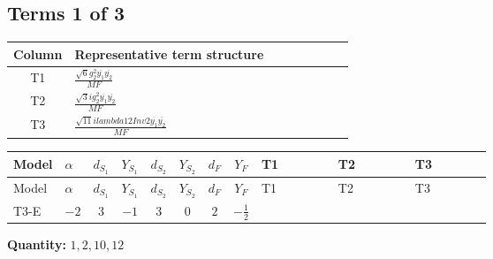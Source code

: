 \documentclass[8pt]{article}
\begin{document}
\begin{landscape}
\subsection*{Terms 1 of 3}
\begin{center}
\begin{tabular}{@{}c >{\raggedright\arraybackslash}p{0.82\linewidth}@{}}
\toprule
Column & Representative term structure \\
\midrule
T1 & \(\displaystyle \frac{\sqrt{6} g_{2}^{2} \overline{y_{1}} \overline{y_{2}}}{MF}\) \\
\midrule
T2 & \(\displaystyle \frac{\sqrt{3} i g_{2}^{2} \overline{y_{1}} \overline{y_{2}}}{MF}\) \\
\midrule
T3 & \(\displaystyle \frac{\sqrt{11} i lambda12Inv2 \overline{y_{1}} \overline{y_{2}}}{MF}\) \\
\midrule
\bottomrule
\end{tabular}
\end{center}
\smallskip
\tiny
\begin{longtable}{@{}llcccccc >{\raggedright\arraybackslash}p{0.21\linewidth} >{\raggedright\arraybackslash}p{0.21\linewidth} >{\raggedright\arraybackslash}p{0.21\linewidth}@{}}
\toprule
Model & $\alpha$ & $d_{S_1}$ & $Y_{S_1}$ & $d_{S_2}$ & $Y_{S_2}$ & $d_F$ & $Y_F$ & T1 & T2 & T3 \\
\midrule
\endfirsthead
\toprule
Model & $\alpha$ & $d_{S_1}$ & $Y_{S_1}$ & $d_{S_2}$ & $Y_{S_2}$ & $d_F$ & $Y_F$ & T1 & T2 & T3 \\
\midrule
\endhead
T3-E & $-2$ & $3$ & $-1$ & $3$ & $0$ & $2$ & $-\frac{1}{2}$ & \scriptsize\adjustbox{max width=\linewidth}{$\begin{gathered} - \frac{\sqrt{6} g_{2}^{2} \overline{y_{1}} \overline{y_{2}}}{6 MF}\end{gathered}$} & \scriptsize\adjustbox{max width=\linewidth}{$\begin{gathered} - \frac{15 \sqrt{3} i g_{2}^{2} \overline{y_{1}} \overline{y_{2}}}{8 MF}\end{gathered}$} & \scriptsize\adjustbox{max width=\linewidth}{$\begin{gathered} - \frac{3 \sqrt{11} i lambda12Inv2 \overline{y_{1}} \overline{y_{2}}}{22 MF}\end{gathered}$} \\
\midrule
\bottomrule
\end{longtable}
\clearpage
\noindent\textbf{Quantity: }$\mathrm{1,2,10,12}$\par\smallskip

\end{landscape}
\end{document}
